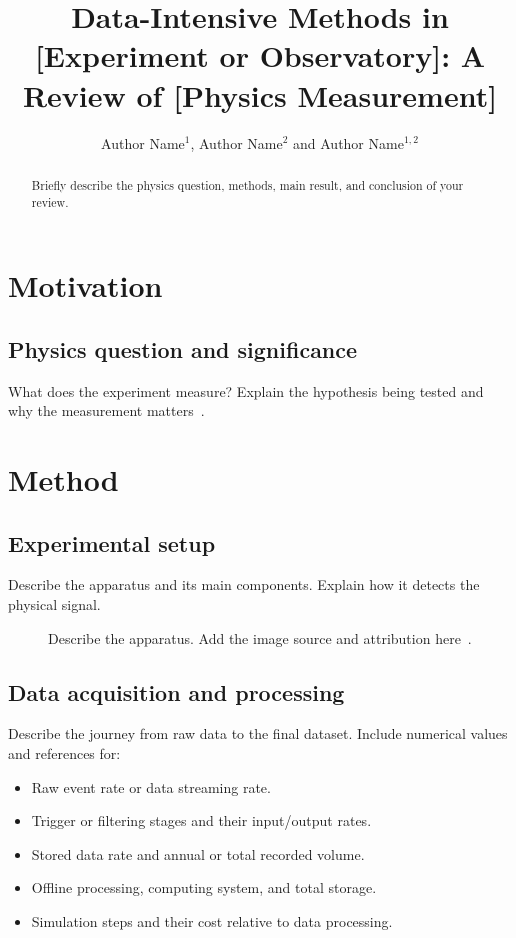 \documentclass{iopconfser}
\begin{document}
\title{Data-Intensive Methods in [Experiment or Observatory]:
A Review of [Physics Measurement]}

\author{Author Name$^{1}$, Author Name$^{2}$ and Author Name$^{1,2}$}



\begin{abstract}
Briefly describe the physics question, methods, main result,
and conclusion of your review.
\end{abstract}

\section{Motivation}

\subsection{Physics question and significance}
What does the experiment measure? Explain the hypothesis
being tested and why the measurement matters~\cite{paper}.

\section{Method}

\subsection{Experimental setup}
Describe the apparatus and its main components.
Explain how it detects the physical signal.

\begin{figure}[htbp]
    \centering
    \caption{Describe the apparatus. Add the image source
    and attribution here~\cite{paper}.}
    \label{fig:detector}
\end{figure}

\subsection{Data acquisition and processing}
Describe the journey from raw data to the final dataset.
Include numerical values and references for:
\begin{itemize}
    \item Raw event rate or data streaming rate.
    \item Trigger or filtering stages and their input/output rates.
    \item Stored data rate and annual or total recorded volume.
    \item Offline processing, computing system, and total storage.
    \item Simulation steps and their cost relative to data processing.
\end{itemize}
\end{document}
